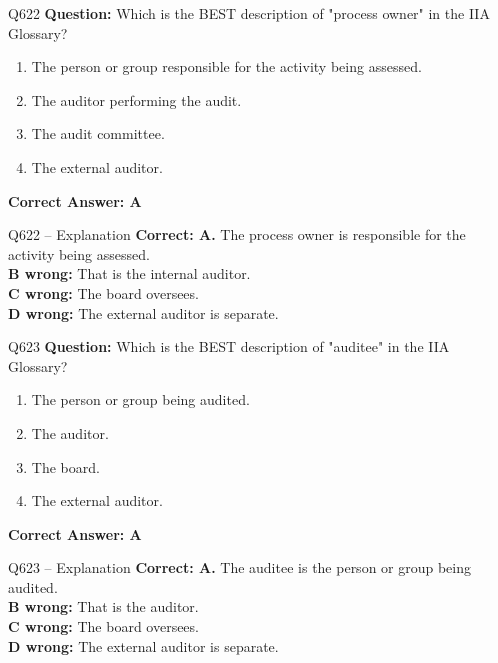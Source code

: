 \documentclass[aspectratio=169,10pt]{beamer}
\begin{document}
	\begin{frame}[t]{Q622}
		\small
		\textbf{Question:} Which is the BEST description of "process owner" in the IIA Glossary?
		\begin{enumerate}[label=\Alph*.,itemsep=1pt,topsep=2pt]
			\item The person or group responsible for the activity being assessed.
			\item The auditor performing the audit.
			\item The audit committee.
			\item The external auditor.
		\end{enumerate}
		\vspace{4pt}
		\textbf{Correct Answer: A}
	\end{frame}
	
	\begin{frame}[t]{Q622 -- Explanation}
		\small
		\textbf{Correct: A.} The process owner is responsible for the activity being assessed. \\[4pt]
		\textbf{B wrong:} That is the internal auditor. \\[2pt]
		\textbf{C wrong:} The board oversees. \\[2pt]
		\textbf{D wrong:} The external auditor is separate.
	\end{frame}
	
	\begin{frame}[t]{Q623}
		\small
		\textbf{Question:} Which is the BEST description of "auditee" in the IIA Glossary?
		\begin{enumerate}[label=\Alph*.,itemsep=1pt,topsep=2pt]
			\item The person or group being audited.
			\item The auditor.
			\item The board.
			\item The external auditor.
		\end{enumerate}
		\vspace{4pt}
		\textbf{Correct Answer: A}
	\end{frame}
	
	\begin{frame}[t]{Q623 -- Explanation}
		\small
		\textbf{Correct: A.} The auditee is the person or group being audited. \\[4pt]
		\textbf{B wrong:} That is the auditor. \\[2pt]
		\textbf{C wrong:} The board oversees. \\[2pt]
		\textbf{D wrong:} The external auditor is separate.
	\end{frame}
	
\end{document}
